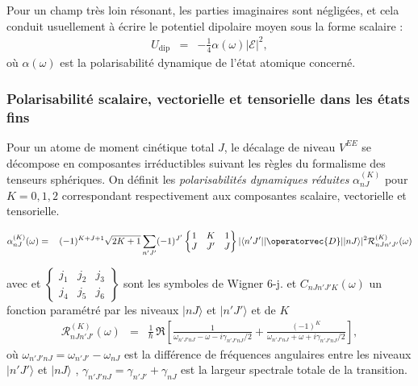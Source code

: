 Pour un champ très loin résonant, les parties imaginaires sont négligées, et cela conduit usuellement à écrire le potentiel dipolaire moyen sous la forme scalaire :
\begin{eqnarray*}
	U_{\mathrm{dip}} &=& -\frac{1}{4}\alpha(\omega)\vert\mathcal{E}\vert^2,
\end{eqnarray*}
où $\alpha(\omega)$ est la polarisabilité dynamique de l’état atomique concerné.

\subsubsection{Polarisabilité scalaire, vectorielle et tensorielle dans les états fins}

Pour un atome de moment cinétique total $J$, le décalage de niveau $V^{EE}$ se décompose en composantes irréductibles suivant les règles du formalisme des tenseurs sphériques. On définit les \emph{polarisabilités dynamiques réduites} $\alpha^{(K)}_{nJ}$ pour $K=0,1,2$ correspondant respectivement aux composantes scalaire, vectorielle et tensorielle.

\begin{eqnarray*}
	\alpha^{(K)}_{nJ}(\omega) &=& \, (-1)^{K + J + 1} \sqrt{2K + 1} \sum_{n'J'} (-1)^{J'} 
\begin{Bmatrix}
1 & K & 1 \\
J & J' & J
\end{Bmatrix}
|\langle n'J' || \operatorvec{D} || nJ \rangle|^2  \mathcal{R}_{nJn'J'}^{(K)}(\omega)\nonumber \\
\end{eqnarray*}

avec et $\begin{Bmatrix} j_1 & j_2 & j_3 \\ j_4 & j_5 & j_6 \end{Bmatrix}$ sont les symboles de Wigner 6-j. et $C_{nJn'J'K}(\omega)$ un fonction paramétré par les niveaux $\vert n J \rangle$ et $\vert n' J' \rangle$ et de $K$ 
\begin{eqnarray*}
	\mathcal{R}_{nJn'J'}^{(K)}(\omega) & = &	 \frac{1}{\hbar} \, \Re \left[ \frac{1}{\omega_{n'J'nJ} - \omega - i\gamma_{n'J'nJ}/2} + \frac{(-1)^K}{\omega_{n'J'nJ} + \omega + i\gamma_{n'J'nJ}/2} \right],
\end{eqnarray*}
où $\omega_{n'J'nJ} = \omega_{n'J'} - \omega_{nJ}$ est la différence de fréquences angulaires entre les niveaux $|n'J'\rangle$ et $|nJ\rangle$ , $\gamma_{n'J'nJ} = \gamma_{n'J'} + \gamma_{nJ}$ est la largeur spectrale totale de la transition.




